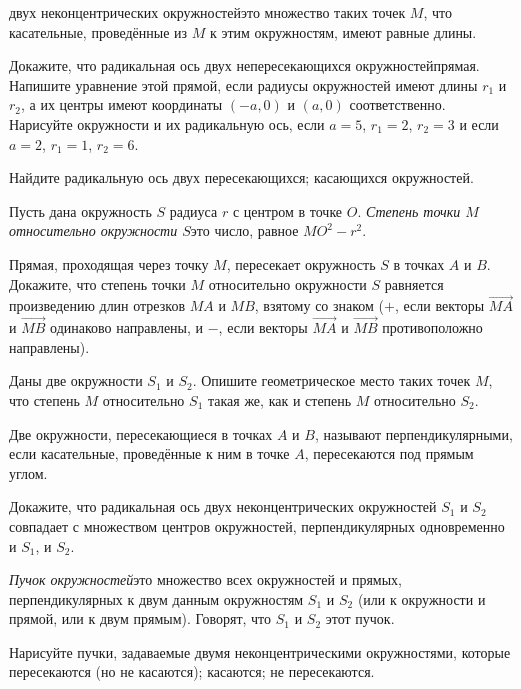 \documentclass[a4paper,12pt]{article}
\begin{document}

 двух неконцентрических окружностей\т это множество таких точек $M$, что касательные, проведённые из $M$ к этим окружностям, имеют равные длины.

Докажите, что радикальная ось двух непересекающихся окружностей\т прямая. Напишите уравнение этой прямой, если радиусы окружностей имеют длины $r_1$ и $r_2$, а их центры имеют координаты $(-a,0)$ и $(a,0)$ соответственно.
Нарисуйте окружности и их радикальную ось, если $a=5$, $r_1=2$, $r_2=3$ и если $a=2$, $r_1=1$, $r_2=6$.

Найдите радикальную ось двух
 пересекающихся;
 касающихся окружностей.

Пусть дана окружность $S$ радиуса $r$ с центром в точке $O$. \emph{Степень точки $M$ относительно окружности $S$}\т это число, равное $MO^2-r^2$.

Прямая, проходящая через точку $M$, пересекает окружность $S$ в точках $A$ и $B$. Докажите, что степень точки $M$ относительно окружности $S$ равняется произведению длин отрезков $MA$ и $MB$, взятому со знаком ($+$, если векторы $\overrightarrow{MA}$ и $\overrightarrow{MB}$ одинаково направлены, и $-$, если векторы $\overrightarrow{MA}$ и $\overrightarrow{MB}$ противоположно направлены).

Даны две окружности $S_1$ и $S_2$. Опишите геометрическое место таких точек $M$, что степень $M$ относительно $S_1$ такая же, как и степень $M$ относительно $S_2$.

Две окружности, пересекающиеся в точках $A$ и $B$, называют  перпендикулярными, если касательные, проведённые к ним в точке $A$, пересекаются под прямым углом.

Докажите, что радикальная ось двух неконцентрических окружностей $S_1$ и $S_2$ совпадает с множеством центров окружностей, перпендикулярных одновременно и $S_1$, и $S_2$.


\emph{Пучок окружностей}\т это множество всех окружностей и прямых, перпендикулярных к двум данным окружностям $S_1$ и $S_2$ (или к окружности и прямой, или к двум прямым). Говорят, что $S_1$ и $S_2$  этот пучок.

\label{pencil1}
Нарисуйте пучки, задаваемые двумя неконцентрическими окружностями, которые\\
 пересекаются (но не касаются);
 касаются;
 не пересекаются.
\end{document}
